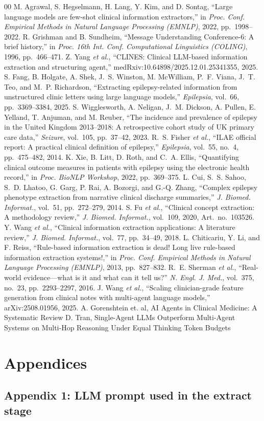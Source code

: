 \documentclass[conference]{IEEEtran}
\begin{document}
\begin{thebibliography}{00}
 M. Agrawal, S. Hegselmann, H. Lang, Y. Kim, and D. Sontag, ``Large language models are few-shot clinical information extractors,'' in \emph{Proc. Conf. Empirical Methods in Natural Language Processing (EMNLP)}, 2022, pp.~1998--2022.
 R. Grishman and B. Sundheim, ``Message Understanding Conference-6: A brief history,'' in \emph{Proc. 16th Int. Conf. Computational Linguistics (COLING)}, 1996, pp.~466--471.
 Z. Yang \emph{et al.}, ``CLINES: Clinical LLM-based information extraction and structuring agent,'' medRxiv:10.64898/2025.12.01.25341355, 2025.
 S. Fang, B. Holgate, A. Shek, J.~S. Winston, M. McWilliam, P.~F. Viana, J.~T. Teo, and M.~P. Richardson, ``Extracting epilepsy-related information from unstructured clinic letters using large language models,'' \emph{Epilepsia}, vol.~66, pp.~3369--3384, 2025.
 S. Wigglesworth, A. Neligan, J.~M. Dickson, A. Pullen, E. Yelland, T. Anjuman, and M. Reuber, ``The incidence and prevalence of epilepsy in the United Kingdom 2013--2018: A retrospective cohort study of UK primary care data,'' \emph{Seizure}, vol.~105, pp.~37--42, 2023.
 R.~S. Fisher \emph{et al.}, ``ILAE official report: A practical clinical definition of epilepsy,'' \emph{Epilepsia}, vol.~55, no.~4, pp.~475--482, 2014.
 K. Xie, B. Litt, D. Roth, and C.~A. Ellis, ``Quantifying clinical outcome measures in patients with epilepsy using the electronic health record,'' in \emph{Proc. BioNLP Workshop}, 2022, pp.~369--375.
 L. Cui, S.~S. Sahoo, S.~D. Lhatoo, G. Garg, P. Rai, A. Bozorgi, and G.-Q. Zhang, ``Complex epilepsy phenotype extraction from narrative clinical discharge summaries,'' \emph{J. Biomed. Informat.}, vol.~51, pp.~272--279, 2014.
 S. Fu \emph{et al.}, ``Clinical concept extraction: A methodology review,'' \emph{J. Biomed. Informat.}, vol.~109, 2020, Art.~no.~103526.
 Y. Wang \emph{et al.}, ``Clinical information extraction applications: A literature review,'' \emph{J. Biomed. Informat.}, vol.~77, pp.~34--49, 2018.
 L. Chiticariu, Y. Li, and F. Reiss, ``Rule-based information extraction is dead! Long live rule-based information extraction systems!,'' in \emph{Proc. Conf. Empirical Methods in Natural Language Processing (EMNLP)}, 2013, pp.~827--832.
 R.~E. Sherman \emph{et al.}, ``Real-world evidence---what is it and what can it tell us?'' \emph{N. Engl. J. Med.}, vol.~375, no.~23, pp.~2293--2297, 2016.
 J. Wang \emph{et al.}, ``Scaling clinician-grade feature generation from clinical notes with multi-agent language models,'' arXiv:2508.01956, 2025.
 A. Gorenshtein et. al, AI Agents in Clinical Medicine: A Systematic Review
 D. Tran, Single-Agent LLMs Outperform Multi-Agent Systems on Multi-Hop Reasoning Under Equal Thinking Token Budgets

\end{thebibliography}

\section{Appendices}
\subsection{Appendix 1: LLM prompt used in the extract stage}

\end{document}

